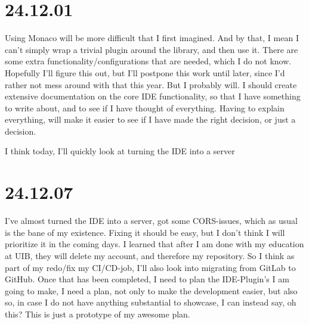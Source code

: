 \section{24.12.01}

Using Monaco will be more difficult that I first imagined. And by that, I mean
I can't simply wrap a trivial plugin around the library, and then use it. There
are some extra functionality/configurations that are needed, which I do not
know. Hopefully I'll figure this out, but I'll postpone this work until later,
since I'd rather not mess around with that this year. But I probably will. I
should create extensive documentation on the core IDE functionality, so that I
have something to write about, and to see if I have thought of everything.
Having to explain everything, will make it easier to see if I have made the
right decision, or just a decision.

I think today, I'll quickly look at turning the IDE into a server


\section{24.12.07}

I've almost turned the IDE into a server, got some CORS-issues, which as usual
is the bane of my existence. Fixing it should be easy, but I don't think I will
prioritize it in the coming days. I learned that after I am done with my
education at UIB, they will delete my account, and therefore my repository. So
I think as part of my redo/fix my CI/CD-job, I'll also look into migrating from
GitLab to GitHub. Once that has been completed, I need to plan the IDE-Plugin's
I am going to make, I need a plan, not only to make the development easier, but
also so, in case I do not have anything substantial to showcase, I can instead
say, oh this? This is just a prototype of my awesome plan.
